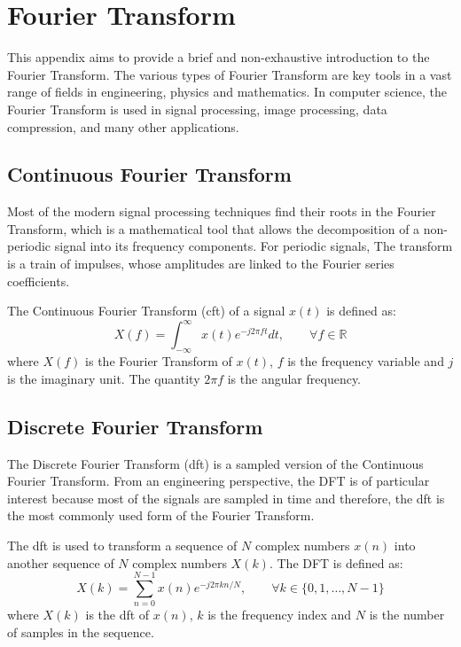 \chapter{Fourier Transform}
\label{app:FFT}
This appendix aims to provide a brief and non-exhaustive introduction to the Fourier Transform. The various types of Fourier Transform are key tools in a vast range of fields in engineering, physics and mathematics. In computer science, the Fourier Transform is used in signal processing, image processing, data compression, and many other applications.

\section{Continuous Fourier Transform}
\label{sec:ContinuousFourierTransform}
Most of the modern signal processing techniques find their roots in the Fourier Transform, which is a mathematical tool that allows the decomposition of a non-periodic signal into its frequency components. For periodic signals, The transform is a train of impulses, whose amplitudes are linked to the Fourier series coefficients.

The Continuous Fourier Transform (\gls{cft}) of a signal $x(t)$ is defined as:
$$
X(f) = \int_{-\infty}^{\infty} x(t) e^{-j2\pi ft} dt, \qquad \forall f \in \mathbb{R}
$$
where $X(f)$ is the Fourier Transform of $x(t)$, $f$ is the frequency variable and $j$ is the imaginary unit. The quantity $2\pi f$ is the angular frequency.

\section{Discrete Fourier Transform}
\label{sec:DiscreteFourierTransform}
The Discrete Fourier Transform (\gls{dft}) is a sampled version of the Continuous Fourier Transform. 
From an engineering perspective, the DFT is of particular interest because most of the signals are sampled in time and therefore, the \gls{dft} is the most commonly used form of the Fourier Transform.

The \gls{dft} is used to transform a sequence of $N$ complex numbers $x(n)$ into another sequence of $N$ complex numbers $X(k)$. The DFT is defined as:
\begin{equation}
\label{eq:DFT}
X(k) = \sum_{n=0}^{N-1} x(n) e^{-j2\pi kn/N}, \qquad \forall k \in \{0, 1, \ldots, N-1\}
\end{equation}
where $X(k)$ is the \gls{dft} of $x(n)$, $k$ is the frequency index and $N$ is the number of samples in the sequence.

